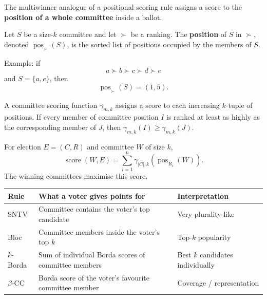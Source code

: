 The multiwinner analogue of a positional scoring rule assigns a score to the \textbf{position of a whole committee} inside a ballot.

\begin{defbox}
Let $S$ be a size-$k$ committee and let $\succ$ be a ranking. The \textbf{position} of $S$ in $\succ$, denoted $\operatorname{pos}_{\succ}(S)$, is the sorted list of positions occupied by the members of $S$.

Example: if
\[
  a \succ b \succ c \succ d \succ e
\]
and $S=\{a,e\}$, then
\[
  \operatorname{pos}_{\succ}(S)=(1,5).
\]
\end{defbox}

\begin{defbox}
A committee scoring function $\gamma_{m,k}$ assigns a score to each increasing $k$-tuple of positions. If every member of committee position $I$ is ranked at least as highly as the corresponding member of $J$, then $\gamma_{m,k}(I)\geq \gamma_{m,k}(J)$.
\end{defbox}

\begin{defbox}
For election $E=(C,R)$ and committee $W$ of size $k$,
\[
  \operatorname{score}(W,E)=\sum_{i=1}^n \gamma_{|C|,k}(\operatorname{pos}_{R_i}(W)).
\]
The winning committees maximise this score.
\end{defbox}

\begin{center}
\renewcommand{\arraystretch}{1.25}
\begin{tabular}{@{}p{2.3cm}p{5.3cm}p{3.6cm}@{}}
\toprule
\textbf{Rule} & \textbf{What a voter gives points for} & \textbf{Interpretation} \\
\midrule
SNTV & Committee contains the voter's top candidate & Very plurality-like \\
Bloc & Committee members inside the voter's top $k$ & Top-$k$ popularity \\
$k$-Borda & Sum of individual Borda scores of committee members & Best $k$ candidates individually \\
$\beta$-CC & Borda score of the voter's favourite committee member & Coverage / representation \\
\bottomrule
\end{tabular}
\end{center}

